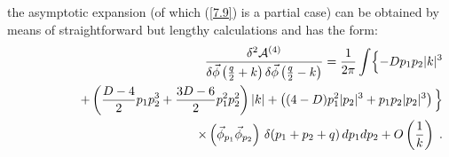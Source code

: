 \documentclass[a4paper,12pt]{article}
\numberwithin{equation}{section}
\begin{document}
the asymptotic expansion (of which (\ref{7.9}) is a partial case) can be obtained
by means of straightforward but lengthy calculations and has the form:
\begin{eqnarray}
 &  & \frac{\delta ^{2}\mathcal{A}^{(4)}}{\delta \vec{\phi }\left( \frac{q}{2}+k\right) \delta \vec{\phi }\left( \frac{q}{2}-k\right) }=\frac{1}{2\pi }\int \Bigl \{-Dp_{1}p_{2}|k|^{3}\nonumber \\
 &  & \qquad \qquad +\left( \frac{D-4}{2}p_{1}p_{2}^{3}+\frac{3D-6}{2}p_{1}^{2}p_{2}^{2}\right) |k|+\left( (4-D)p_{1}^{2}|p_{2}|^{3}+p_{1}p_{2}|p_{2}|^{3}\right) \Bigl \}\nonumber \\
 &  & \qquad \qquad \qquad \qquad \qquad \times \left( \vec{\phi }_{p_{1}}\vec{\phi }_{p_{2}}\right) \, \delta (p_{1}+p_{2}+q)\, dp_{1}dp_{2}+O\left( \frac{1}{k}\right) \; .\label{7.10} 
\end{eqnarray}
\end{document}
